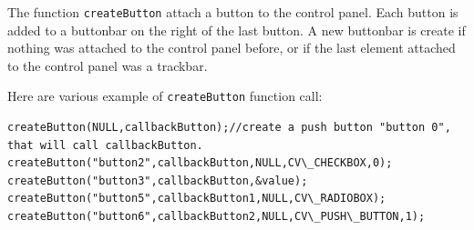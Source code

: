 The function \texttt{createButton} attach a button to the control panel. Each button is added to a buttonbar on the right of the last button.
A new buttonbar is create if nothing was attached to the control panel before, or if the last element attached to the control panel was a trackbar.

Here are various example of \texttt{createButton}  function call:
\begin{lstlisting}
createButton(NULL,callbackButton);//create a push button "button 0", that will call callbackButton. 
createButton("button2",callbackButton,NULL,CV\_CHECKBOX,0);
createButton("button3",callbackButton,&value);
createButton("button5",callbackButton1,NULL,CV\_RADIOBOX);
createButton("button6",callbackButton2,NULL,CV\_PUSH\_BUTTON,1);
\end{lstlisting}

\fi